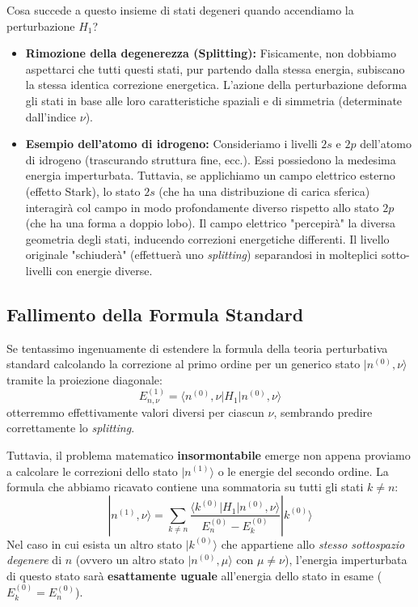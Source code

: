 Cosa succede a questo insieme di stati degeneri quando accendiamo la perturbazione $H_1$?
\begin{itemize}
\item \textbf{Rimozione della degenerezza (Splitting):} Fisicamente, non dobbiamo aspettarci che tutti questi stati, pur partendo dalla stessa energia, subiscano la stessa identica correzione energetica. L'azione della perturbazione deforma gli stati in base alle loro caratteristiche spaziali e di simmetria (determinate dall'indice $\nu$).
\item \textbf{Esempio dell'atomo di idrogeno:} Consideriamo i livelli $2s$ e $2p$ dell'atomo di idrogeno (trascurando struttura fine, ecc.). Essi possiedono la medesima energia imperturbata. Tuttavia, se applichiamo un campo elettrico esterno (effetto Stark), lo stato $2s$ (che ha una distribuzione di carica sferica) interagirà col campo in modo profondamente diverso rispetto allo stato $2p$ (che ha una forma a doppio lobo). Il campo elettrico "percepirà" la diversa geometria degli stati, inducendo correzioni energetiche differenti. Il livello originale "schiuderà" (effettuerà uno \textit{splitting}) separandosi in molteplici sotto-livelli con energie diverse.
\end{itemize}

\subsection{Fallimento della Formula Standard}

Se tentassimo ingenuamente di estendere la formula della teoria perturbativa standard calcolando la correzione al primo ordine per un generico stato $\vert{}n^{(0)}, \nu\rangle$ tramite la proiezione diagonale:
\begin{equation}
E_{n,\nu}^{(1)} = \langle n^{(0)}, \nu | H_1 | n^{(0)}, \nu \rangle
\end{equation}
otterremmo effettivamente valori diversi per ciascun $\nu$, sembrando predire correttamente lo \textit{splitting}.

Tuttavia, il problema matematico \textbf{insormontabile} emerge non appena proviamo a calcolare le correzioni dello stato $\vert{}n^{(1)}\rangle$ o le energie del secondo ordine. La formula che abbiamo ricavato contiene una sommatoria su tutti gli stati $k \neq n$:
\begin{equation}
|n^{(1)}, \nu\rangle = \sum_{k \neq n} \frac{\langle k^{(0)} | H_1 | n^{(0)}, \nu \rangle}{E_n^{(0)} - E_k^{(0)}} |k^{(0)}\rangle
\end{equation}
Nel caso in cui esista un altro stato $\vert{}k^{(0)}\rangle$ che appartiene allo \textit{stesso sottospazio degenere} di $n$ (ovvero un altro stato $\vert{}n^{(0)}, \mu\rangle$ con $\mu \neq \nu$), l'energia imperturbata di questo stato sarà \textbf{esattamente uguale} all'energia dello stato in esame ($E_k^{(0)} = E_n^{(0)}$).

